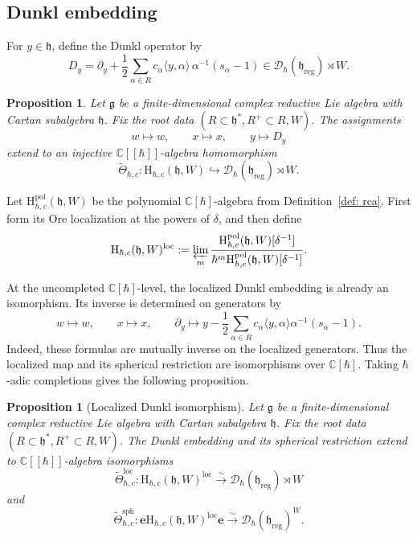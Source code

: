 \documentclass[11pt,reqno]{amsart}
\newtheorem{proposition}[theorem]{Proposition}
\theoremstyle{definition}
\newcommand{\bbC}{\mathbb{C}}
\newcommand{\be}{\mathbf{e}}
\newcommand{\tos}{\mapsto}
\newcommand{\mD}{\mathcal{D}}
\newcommand{\into}{\hookrightarrow}
\newcommand{\fkg}{\mathfrak{g}}
\newcommand{\rmH}{\mathrm{H}}
\newcommand{\fkh}{\mathfrak{h}}
\newcommand{\reg}{\mathrm{reg}}
\newcommand{\sph}{{\mathrm{sph}}}
\newcommand{\loc}{{\mathrm{loc}}}
\begin{document}
\subsection{Dunkl embedding}
For \(y\in\fkh\), define the Dunkl operator by
\begin{equation}\label{eq: dunkl}
	D_y=
	\partial_y+\frac12\sum_{\alpha\in R}c_\alpha
	\langle y,\alpha\rangle\,\alpha^{-1}(s_\alpha-1)
	\in\mD_\hbar(\fkh_{\reg})\rtimes W.
\end{equation}


\begin{proposition}\cite[Proposition~4.5]{EG2002}
Let \(\fkg\) be a finite-dimensional complex reductive Lie algebra with Cartan subalgebra \(\fkh\).
Fix the root data \((R\subset\fkh^*, R^+ \subset R, W)\).
The assignments
	\[
	w\tos w,
	\qquad
	x\tos x,
	\qquad
	y\tos D_y
	\]
	{extend to an injective \(\bbC[[\hbar]]\)-algebra homomorphism}
	\[
	\widetilde\Theta_{\hbar,c}:
	\rmH_{\hbar,c}(\fkh,W)
	\into
	\mD_\hbar(\fkh_{\reg})\rtimes W.
	\]
\end{proposition}



Let \(\rmH_{\hbar,c}^{\mathrm{pol}}(\fkh,W)\) be the polynomial
\(\bbC[\hbar]\)-algebra from Definition~\ref{def: rca}.  First form its
 Ore localization at the powers of \(\delta\), and then define
\[
\rmH_{\hbar,c}(\fkh,W)^\loc
:=
\varprojlim_m
\frac{
\rmH_{\hbar,c}^{\mathrm{pol}}(\fkh,W)[\delta^{-1}]
}{
\hbar^m\rmH_{\hbar,c}^{\mathrm{pol}}(\fkh,W)[\delta^{-1}]
}.
\]

At the uncompleted \(\bbC[\hbar]\)-level, the localized Dunkl embedding is
already an isomorphism.
Its inverse is determined on generators by
\[
w\longmapsto w,
\qquad
x\longmapsto x,
\qquad
\partial_y\longmapsto
y-\frac12\sum_{\alpha\in R}c_\alpha
\langle y,\alpha\rangle\alpha^{-1}(s_\alpha-1).
\]
Indeed, these formulas are mutually inverse on the localized generators.
Thus the localized map and its spherical restriction are isomorphisms
over \(\bbC[\hbar]\).  Taking \(\hbar\)-adic completions gives the
following proposition. 


\begin{proposition}[Localized Dunkl isomorphism]
\label{prop: dunkl embed loc neq 0}
Let \(\fkg\) be a finite-dimensional complex reductive Lie algebra with Cartan subalgebra \(\fkh\).
	Fix the root data \((R\subset\fkh^*, R^+ \subset R, W)\).
	The Dunkl embedding and its spherical restriction extend to
	\(\bbC[[\hbar]]\)-algebra isomorphisms
	\[
	\widetilde\Theta_{\hbar,c}^{\loc}:
	\rmH_{\hbar,c}(\fkh,W)^\loc
	\xrightarrow{\sim}
	\mD_\hbar(\fkh_{\reg})\rtimes W
	\]
	and
	\[
	\widetilde\Theta_{\hbar,c}^{\sph}:
	\be\rmH_{\hbar,c}(\fkh,W)^\loc\be
	\xrightarrow{\sim}
	\mD_\hbar(\fkh_{\reg})^W.
	\]
\end{proposition}
\end{document}
